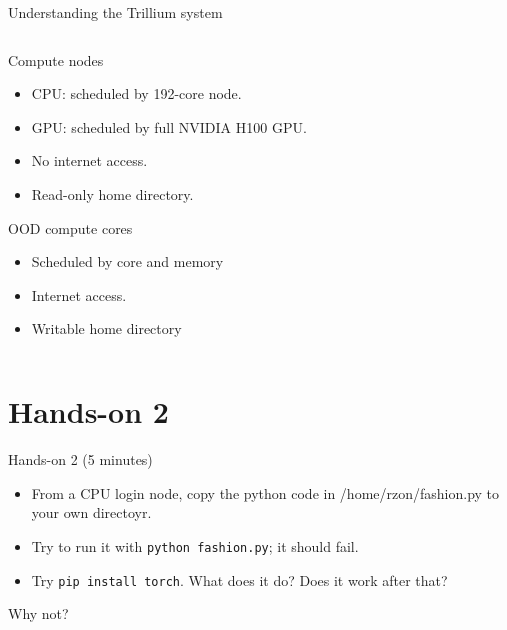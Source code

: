 \documentclass[
  10pt,
  ignorenonframetext,
  aspectratio=169]{beamer}
\providecommand{\tightlist}{%
  \setlength{\itemsep}{0pt}\setlength{\parskip}{0pt}}
\begin{document}
\begin{frame}{Understanding the Trillium system}
\begin{columns}[T]
\begin{column}{0.47\linewidth}
\begin{block}{Compute nodes}\setlength{\parskip}{0.5\baselineskip}
\label{compute-nodes-1}
\vspace{-1mm}

\begin{itemize}
\tightlist
\item
  CPU: scheduled by 192-core node.
\item
  GPU: scheduled by full NVIDIA H100 GPU.
\item
  No internet access.
\item
  Read-only home directory.
\end{itemize}
\end{block}

\begin{block}{OOD compute cores}\setlength{\parskip}{0.5\baselineskip}
\label{ood-compute-cores-1}
\vspace{-1mm}

\begin{itemize}
\tightlist
\item
  Scheduled by core and memory
\item
  Internet access.
\item
  Writable home directory
\end{itemize}
\end{block}
\end{column}
\end{columns}
\end{frame}

\section{Hands-on 2}\label{hands-on-2}

\begin{frame}[fragile]{Hands-on 2 (5 minutes)}
\label{hands-on-2-5-minutes}
\begin{itemize}
\item
  From a CPU login node, copy the python code in /home/rzon/fashion.py to your own directoyr.
\item
  Try to run it with \texttt{python\ fashion.py}; it should fail.
\item
  Try \texttt{pip\ install\ torch}. What does it do? Does it work after that?
\end{itemize}

Why not?
\end{frame}
\end{document}
